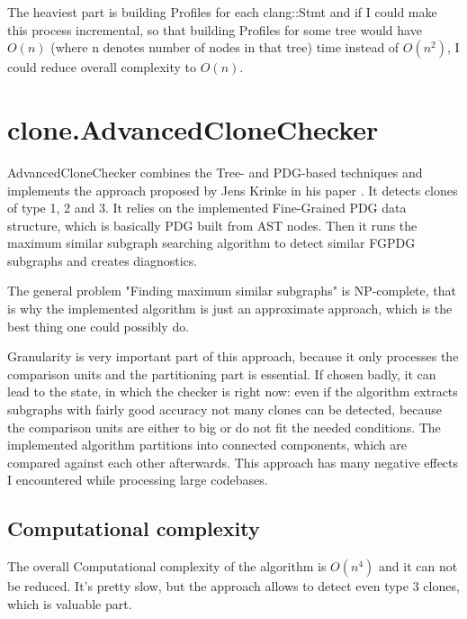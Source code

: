 \documentclass[a0,portrait]{a0poster}
\begin{document}
\begin{multicols}{2}
The heaviest part is building Profiles for each clang::Stmt and if I could make this process 
incremental, so that building Profiles for some tree would have $O(n)$ (where n denotes number of 
nodes in that tree) time instead of $O(n^2)$, I could reduce overall complexity to $O(n)$.


\section*{clone.AdvancedCloneChecker}

AdvancedCloneChecker combines the Tree- and PDG-based techniques and implements the approach
proposed by Jens Krinke in his paper \cite{FineGrainedPDG}. It detects clones of type 1, 2 and 3. 
It relies on the implemented Fine-Grained PDG data structure, which is basically PDG built from AST 
nodes. Then it runs the maximum similar subgraph searching algorithm to detect similar FGPDG 
subgraphs and creates diagnostics.

The general problem "Finding maximum similar subgraphs" is NP-complete, that is why the implemented 
algorithm is just an approximate approach, which is the best thing one could possibly do.

Granularity is very important part of this approach, because it only processes the comparison
units and the partitioning part is essential. If chosen badly, it can lead to the state, in which
the checker is right now: even if the algorithm extracts subgraphs with fairly good accuracy
not many clones can be detected, because the comparison units are either to big or do not fit
the needed conditions. The implemented algorithm partitions into connected components, which are
compared against each other afterwards. This approach has many negative effects I encountered
while processing large codebases.

\subsection*{Computational complexity}

The overall Computational complexity of the algorithm is $O(n^4)$ and it can not be reduced. It's 
pretty slow, but the approach allows to detect even type 3 clones, which is valuable part.



\end{multicols}
\end{document}
